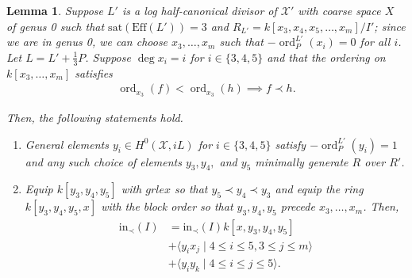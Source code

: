 \documentclass{amsart}
\theoremstyle{plain}
\newtheorem{lem}[thm]{Lemma}
\theoremstyle{definition}
\theoremstyle{remark}
\numberwithin{equation}{section}
\newcommand \sx{\mathscr X}
\DeclareMathOperator{\ord}{ord}
\newcommand \halfcan{L}
\newcommand \initial{\text{in}}
\newcommand \Eff{\text{Eff}}
\newcommand \sat{\text{sat}}
\begin{document}
\begin{lem}
\label{lem:sat-3}
Suppose $L'$ is a log half-canonical divisor of $\sx'$ with coarse
space $X$ of genus 0 such that $\sat(\Eff(\halfcan')) = 3$ and $R_
{\halfcan'} = k[x_3, x_4 , x_5, \ldots, x_m]/I'$; since we are in genus 0, we can choose $x_3, \ldots, x_m$ such that $-\ord^{L'}_P(x_i)=0$ for all $i$. Let $L = L' + \frac
{1}{3}P$. Suppose $\deg x_i = i$ for $i \in \{3, 4, 5\}$ and that
the ordering on $k[x_3, \ldots, x_m]$ satisfies
\begin{align*}
	\ord_{x_3}(f) < \ord_{x_3}(h) \implies f \prec h.
\end{align*}

\noindent
Then, the following statements hold.

\begin{enumerate}
	\item[(a)] General elements  $y_i \in H^0(\sx, iL)$ for $i \in \{3,
		4,5\}$ satisfy $-\ord_P^{\halfcan'}(y_i) = 1$ and any such choice of elements $y
		_3, y_4,$ and $y_5$ minimally generate $R$ over $R'$.
	\item[(b)] Equip $k[y_3, y_4, y_5]$ with $grlex$ so that $y_5 \prec 
		y_4 \prec y_3$
		and equip the ring $k[y_3, y_4, y_5, x]$ with the block order so that $y_3, y_4, y_5$ precede $x_3, \ldots, x_m$.  Then,
		\begin{align*}
			\initial_\prec(I) &= \initial_\prec(I) k[x, y_3, y_4, y_5] \\
			&+ \langle y_i x_j \mid 4 \leq i \leq 5, 3 \leq j \leq m\rangle \\
			&+ \langle y_i y_k \mid 4 \leq i \leq j \leq 5\rangle.
		\end{align*}
\end{enumerate}
\end{lem}
\end{document}
